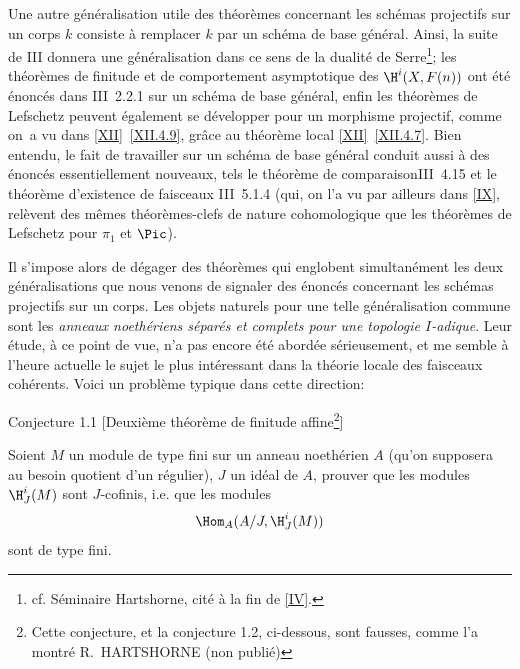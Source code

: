 Une autre g\'en\'eralisation utile des th\'eor\`emes concernant les sch\'emas projectifs sur un corps $k$ consiste \`a remplacer $k$ par un sch\'ema de base g\'en\'eral. Ainsi, la suite de {\EGA III} donnera une g\'en\'eralisation dans ce sens de la dualit\'e de Serre\footnote{cf. S\'eminaire Hartshorne, cit\'e \`a la fin de {\Exp \ref{IV}}.}; les th\'eor\`emes de finitude et de comportement asymptotique des $\H^i(X, F(n))$ ont \'et\'e \'enonc\'es dans \EGA III~2.2.1 sur un sch\'ema de base g\'en\'eral, enfin les th\'eor\`emes de Lefschetz peuvent \'egalement se d\'evelopper pour un morphisme projectif, comme on~a vu dans \ref{XII}~\ref{XII.4.9}, gr\^ace au th\'eor\`eme local \ref{XII}~\ref{XII.4.7}. Bien entendu, le fait de travailler sur un sch\'ema de base g\'en\'eral conduit aussi \`a des \'enonc\'es essentiellement nouveaux, tels le \og th\'eor\`eme de comparaison\fg \EGA III~4.15 et le th\'eor\`eme d'existence de faisceaux \EGA III~5.1.4 (qui, on l'a vu par ailleurs dans \ref{IX}, rel\`event des m\^emes th\'eor\`emes-clefs de nature cohomologique que les th\'eor\`emes de Lefschetz pour $\pi_1$ et $\Pic$).

Il s'impose alors de d\'egager des th\'eor\`emes qui englobent simultan\'ement les deux g\'en\'eralisations que nous venons de signaler des \'enonc\'es concernant les sch\'emas projectifs sur un corps. Les objets naturels pour une telle g\'en\'eralisation commune sont les \emph{anneaux noethériens séparés et complets pour une topologie $I$-adique}. Leur \'etude, \`a ce point de vue, n'a pas encore \'et\'e abord\'ee s\'erieusement, et me semble \`a l'heure actuelle le sujet le plus int\'eressant dans la th\'eorie locale des faisceaux coh\'erents. Voici un probl\`eme typique dans cette direction:

\label{XIII.1.1}

\begin{enonce*}{Conjecture 1.1}
[\og Deuxi\`eme th\'eor\`eme de finitude affine\fg\footnote{Cette conjecture, et la conjecture 1.2, ci-dessous, sont fausses, comme l'a montr\'e R.~HARTSHORNE (non publi\'e)}\ndemark]

Soient $M$ un module de type fini sur un anneau noeth\'erien $A$ (qu'on supposera au besoin quotient d'un r\'egulier), $J$ un id\'eal de $A$, prouver que les modules $\H^i_J(M)$ sont \og $J$-cofinis\fg, i.e. que les modules
$$
\Hom_A(A/J, \H^i_J(M))$$
sont de type fini.
\end{enonce*}

